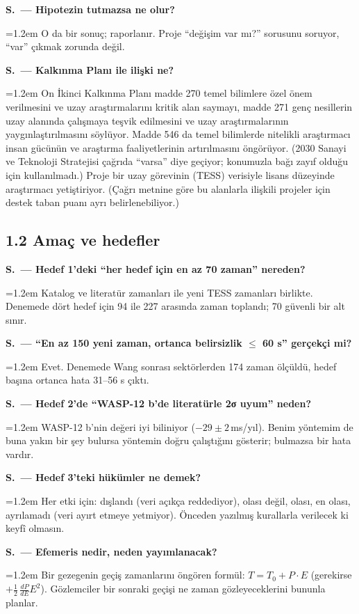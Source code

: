 \documentclass[11pt,a4paper]{article}
\newcounter{sor}[section]
\newcommand{\SC}[2]{\stepcounter{sor}\par\noindent\textbf{S\thesection.\thesor\ — #1}\par\nopagebreak
  \noindent\hangindent=1.2em\hangafter=0 #2\par\vspace{0.35em}}
\newcommand{\msyil}{\,ms/yıl}
\begin{document}
\SC{Hipotezin tutmazsa ne olur?}{O da bir sonuç; raporlanır. Proje ``değişim var mı?'' sorusunu soruyor, ``var'' çıkmak zorunda değil.}
\SC{Kalkınma Planı ile ilişki ne?}{On İkinci Kalkınma Planı madde 270 temel bilimlere özel önem verilmesini ve uzay araştırmalarını kritik alan saymayı, madde 271 genç nesillerin uzay alanında çalışmaya teşvik edilmesini ve uzay araştırmalarının yaygınlaştırılmasını söylüyor. Madde 546 da temel bilimlerde nitelikli araştırmacı insan gücünün ve araştırma faaliyetlerinin artırılmasını öngörüyor. (2030 Sanayi ve Teknoloji Stratejisi çağrıda ``varsa'' diye geçiyor; konumuzla bağı zayıf olduğu için kullanılmadı.) Proje bir uzay görevinin (TESS) verisiyle lisans düzeyinde araştırmacı yetiştiriyor. (Çağrı metnine göre bu alanlarla ilişkili projeler için destek taban puanı ayrı belirlenebiliyor.)}

\subsection{1.2 Amaç ve hedefler}
\SC{Hedef 1'deki ``her hedef için en az 70 zaman'' nereden?}{Katalog ve literatür zamanları ile yeni TESS zamanları birlikte. Denemede dört hedef için 94 ile 227 arasında zaman toplandı; 70 güvenli bir alt sınır.}
\SC{``En az 150 yeni zaman, ortanca belirsizlik $\leq$ 60 s'' gerçekçi mi?}{Evet. Denemede Wang sonrası sektörlerden 174 zaman ölçüldü, hedef başına ortanca hata 31--56 s çıktı.}
\SC{Hedef 2'de ``WASP-12 b'de literatürle 2σ uyum'' neden?}{WASP-12 b'nin değeri iyi biliniyor ($-29\pm2$\msyil). Benim yöntemim de buna yakın bir şey bulursa yöntemin doğru çalıştığını gösterir; bulmazsa bir hata vardır.}
\SC{Hedef 3'teki hükümler ne demek?}{Her etki için: dışlandı (veri açıkça reddediyor), olası değil, olası, en olası, ayrılamadı (veri ayırt etmeye yetmiyor). Önceden yazılmış kurallarla verilecek ki keyfî olmasın.}
\SC{Efemeris nedir, neden yayımlanacak?}{Bir gezegenin geçiş zamanlarını öngören formül: $T = T_0 + P\cdot E$ (gerekirse $+\tfrac12\,\tfrac{dP}{dE}E^2$). Gözlemciler bir sonraki geçişi ne zaman gözleyeceklerini bununla planlar.}
\end{document}
